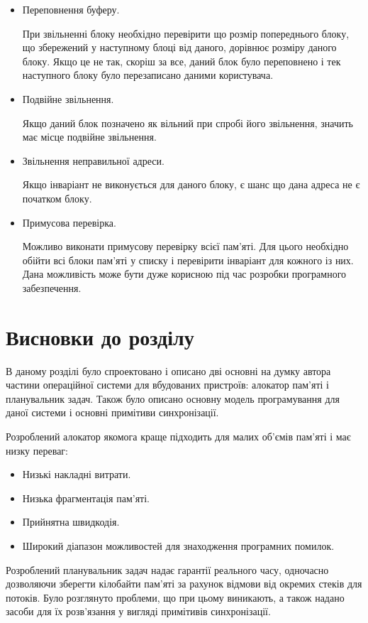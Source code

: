 \documentclass[oneside,14pt,a4paper,final]{myextreport}
\newcommand{\specialsection}[1]{\section*{#1}\addcontentsline{toc}{section}{#1}}
\newcommand{\chapterconslusions}{
  \clearpage
  \specialsection{Висновки до розділу \thechapter}
}
\begin{document}
\begin{itemize}
\item Переповнення буферу.

  При звільненні блоку необхідно перевірити що розмір попереднього блоку, що збережений у наступному блоці від даного, дорівнює розміру даного блоку. Якщо це не так, скоріш за все, даний блок було переповнено і тек наступного блоку було перезаписано даними користувача.

\item Подвійне звільнення.

  Якщо даний блок позначено як вільний при спробі його звільнення, значить має місце подвійне звільнення.

\item Звільнення неправильної адреси.

  Якщо інваріант не виконується для даного блоку, є шанс що дана адреса не є початком блоку.

\item Примусова перевірка.

  Можливо виконати примусову перевірку всієї пам'яті. Для цього необхідно обійти всі блоки пам'яті у списку і перевірити інваріант для кожного із них. Дана можливість може бути дуже корисною під час розробки програмного забезпечення.
\end{itemize}

\chapterconslusions{}

В даному розділі було спроектовано і описано дві основні на думку автора частини операційної системи для вбудованих пристроїв: алокатор пам'яті і планувальник задач. Також було описано основну модель програмування для даної системи і основні примітиви синхронізації.

Розроблений алокатор якомога краще підходить для малих об'ємів пам'яті і має низку переваг:
\begin{itemize}[nosep]
\item Низькі накладні витрати.
\item Низька фрагментація пам'яті.
\item Прийнятна швидкодія.
\item Широкий діапазон можливостей для знаходження програмних помилок.
\end{itemize}

Розроблений планувальник задач надає гарантії реального часу, одночасно дозволяючи зберегти кілобайти пам'яті за рахунок відмови від окремих стеків для потоків. Було розглянуто проблеми, що при цьому виникають, а також надано засоби для їх розв'язання у вигляді примітивів синхронізації.
\end{document}
